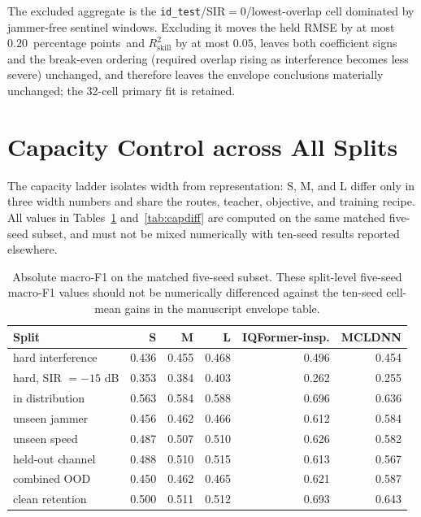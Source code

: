 \documentclass[letterpaper,onecolumn,11pt,journal]{IEEEtran}
\newcommand{\pp}{percentage points}
\begin{document}
The excluded aggregate is the \texttt{id\_test}/SIR$=0$/lowest-overlap cell
dominated by jammer-free sentinel windows. Excluding it moves the held RMSE
by at most $0.20$~\pp\ and $R^2_{\mathrm{skill}}$ by at most $0.05$, leaves
both coefficient signs and the break-even ordering (required overlap rising
as interference becomes less severe) unchanged, and therefore leaves the
envelope conclusions materially unchanged; the 32-cell primary fit is
retained.

\section{Capacity Control across All Splits}
The capacity ladder isolates width from representation: S, M, and L differ only
in three width numbers and share the routes, teacher, objective, and training
recipe. All values in Tables~\ref{tab:capabs} and~\ref{tab:capdiff} are
computed on the same matched five-seed subset, and must not be mixed
numerically with ten-seed results reported elsewhere.

\begin{table}[t]
\centering
\caption{Absolute macro-F1 on the matched five-seed subset. These split-level
five-seed macro-F1 values should not be numerically differenced against the
ten-seed cell-mean gains in the manuscript envelope table.}
\label{tab:capabs}
\footnotesize
\setlength{\tabcolsep}{4pt}
\begin{tabular}{lrrrrr}
\toprule
Split & S & M & L & IQFormer-insp. & MCLDNN\\
\midrule
hard interference & 0.436 & 0.455 & 0.468 & 0.496 & 0.454\\
hard, SIR $=-15$ dB & 0.353 & 0.384 & 0.403 & 0.262 & 0.255\\
in distribution & 0.563 & 0.584 & 0.588 & 0.696 & 0.636\\
unseen jammer & 0.456 & 0.462 & 0.466 & 0.612 & 0.584\\
unseen speed & 0.487 & 0.507 & 0.510 & 0.626 & 0.582\\
held-out channel & 0.488 & 0.510 & 0.515 & 0.613 & 0.567\\
combined OOD & 0.450 & 0.462 & 0.465 & 0.621 & 0.587\\
clean retention & 0.500 & 0.511 & 0.512 & 0.693 & 0.643\\
\bottomrule
\end{tabular}
\end{table}
\end{document}
